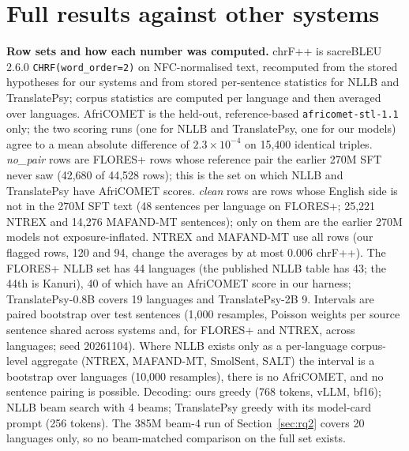 \section{Full results against other systems}\label{app:fullresults}
\textbf{Row sets and how each number was computed.} chrF++ is sacreBLEU 2.6.0 \texttt{CHRF(word\_order=2)} on NFC-normalised text, recomputed from the stored hypotheses for our systems and from stored per-sentence statistics for NLLB and TranslatePsy; corpus statistics are computed per language and then averaged over languages. AfriCOMET is the held-out, reference-based \texttt{africomet-stl-1.1} only; the two scoring runs (one for NLLB and TranslatePsy, one for our models) agree to a mean absolute difference of $2.3\times10^{-4}$ on 15,400 identical triples. \emph{no\_pair} rows are FLORES+ rows whose reference pair the earlier 270M SFT never saw (42,680 of 44,528 rows); this is the set on which NLLB and TranslatePsy have AfriCOMET scores. \emph{clean} rows are rows whose English side is not in the 270M SFT text (48 sentences per language on FLORES+; 25,221 NTREX and 14,276 MAFAND-MT sentences); only on them are the earlier 270M models not exposure-inflated. NTREX and MAFAND-MT use all rows (our flagged rows, 120 and 94, change the averages by at most 0.006 chrF++). The FLORES+ NLLB set has 44 languages (the published NLLB table has 43; the 44th is Kanuri), 40 of which have an AfriCOMET score in our harness; TranslatePsy-0.8B covers 19 languages and TranslatePsy-2B 9. Intervals are paired bootstrap over test sentences (1,000 resamples, Poisson weights per source sentence shared across systems and, for FLORES+ and NTREX, across languages; seed 20261104). Where NLLB exists only as a per-language corpus-level aggregate (NTREX, MAFAND-MT, SmolSent, SALT) the interval is a bootstrap over languages (10,000 resamples), there is no AfriCOMET, and no sentence pairing is possible. Decoding: ours greedy (768 tokens, vLLM, bf16); NLLB beam search with 4 beams; TranslatePsy greedy with its model-card prompt (256 tokens). The 385M beam-4 run of Section~\ref{sec:rq2} covers 20 languages only, so no beam-matched comparison on the full set exists.

